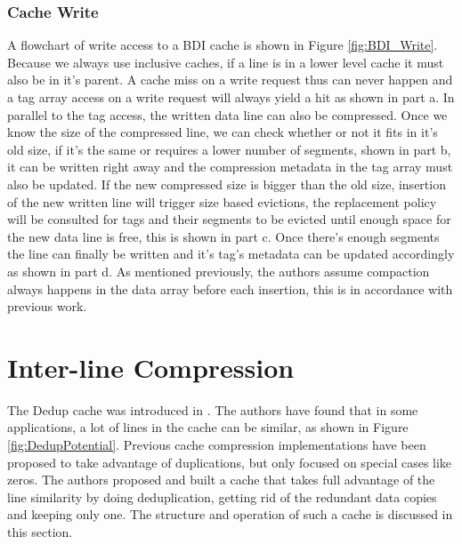\subsubsection{Cache Write}
A flowchart of write access to a BDI cache is shown in Figure \ref{fig:BDI_Write}. Because we always use inclusive caches, if a line is in a lower level cache it must also be in it's parent. A cache miss on a write request thus can never happen and a tag array access on a write request will always yield a hit as shown in part a. In parallel to the tag access, the written data line can also be compressed. Once we know the size of the compressed line, we can check whether or not it fits in it's old size, if it's the same or requires a lower number of segments, shown in part b, it can be written right away and the compression metadata in the tag array must also be updated. If the new compressed size is bigger than the old size, insertion of the new written line will trigger size based evictions, the replacement policy will be consulted for tags and their segments to be evicted until enough space for the new data line is free, this is shown in part c. Once there's enough segments the line can finally be written and it's tag's metadata can be updated accordingly as shown in part d.
As mentioned previously, the authors assume compaction always happens in the data array before each insertion, this is in accordance with previous work.

\section{Inter-line Compression}
\label{sec:Dedup}
The Dedup cache was introduced in \cite{dedup}. The authors have found that in some applications, a lot of lines in the cache can be similar, as shown in Figure \ref{fig:DedupPotential}. Previous cache compression implementations have been proposed to take advantage of duplications, but only focused on special cases like zeros\cite{alameldeen2004adaptive, dusser2009zero}. The authors proposed and built a cache that takes full advantage of the line similarity by doing deduplication, getting rid of the redundant data copies and keeping only one. The structure and operation of such a cache is discussed in this section.
